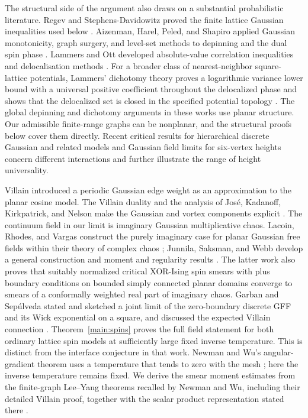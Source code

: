 The structural side of the argument also draws on a substantial
probabilistic literature.  Regev and Stephens-Davidowitz proved the
finite lattice Gaussian inequalities used below \citep{RSD2017}.
Aizenman, Harel, Peled, and Shapiro applied Gaussian monotonicity,
graph surgery, and level-set methods to depinning and the dual spin
phase \citep{AizenmanHarelPeledShapiro2022}.  Lammers and Ott developed
absolute-value correlation inequalities and delocalisation methods
\citep{LammersOtt2024}.  For a broader class of nearest-neighbor
square-lattice potentials, Lammers' dichotomy theory proves a logarithmic
variance lower bound with a universal positive coefficient throughout
the delocalized phase and shows that the delocalized set is closed in
the specified potential topology \citep{LammersDichotomy}.
The global depinning and dichotomy arguments in these works use planar
structure.  Our admissible finite-range graphs can be nonplanar, and
the structural proofs below cover them directly.
Recent critical results for hierarchical discrete Gaussian and related models
\citep{BiskupHuang2025} and Gaussian field limits for six-vertex heights
\citep{DuminilCopinKozlowskiLammersManolescu2026} concern different
interactions and further illustrate the range of height universality.

Villain introduced a periodic Gaussian edge weight as an approximation
to the planar cosine model.  The Villain duality and the analysis of
Jos\'e, Kadanoff, Kirkpatrick, and Nelson make the Gaussian and vortex
components explicit \citep{Villain1975,JoseKadanoffKirkpatrickNelson1977}.
The continuum field in our limit is imaginary Gaussian multiplicative
chaos.  Lacoin, Rhodes, and Vargas construct the purely imaginary case
for planar Gaussian free fields within their theory of complex chaos
\citep{LacoinRhodesVargas2015};
Junnila, Saksman, and Webb develop a general construction and moment
and regularity results \citep{JunnilaSaksmanWebb2020}.  The latter work
also proves that suitably normalized critical XOR-Ising spin smears with
plus boundary conditions on bounded simply connected planar domains
converge to smears of a conformally weighted real part of imaginary chaos.
Garban and Sep\'ulveda stated and sketched a joint limit of the
zero-boundary discrete GFF and its Wick exponential on a square, and
discussed the expected Villain connection
\citep[Proposition~6.3 and the discussion preceding Conjecture~3]{GarbanSepulveda2024}.
Theorem~\ref{main:spins} proves the full field statement for both
ordinary lattice spin models at sufficiently large fixed inverse
temperature.  This is distinct from the interface conjecture in that
work.  Newman and Wu's angular-gradient theorem uses a temperature
that tends to zero with the mesh \citep{NewmanWu2018}; here the
inverse temperature remains fixed.  We derive the smear moment estimates
from the finite-graph Lee--Yang theorems recalled by Newman and Wu,
including their detailed Villain proof, together with the scalar product
representation stated there \citep{NewmanWu2019}.

